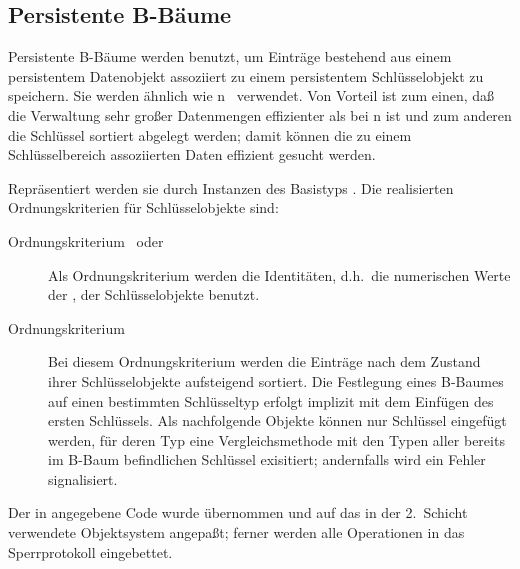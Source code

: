 \subsection{Persistente B-B\"{a}ume}%
\label{sec:plbtr}%
%
Persistente B-B\"{a}ume \cite[]{bib:gr93} werden
benutzt, um Eintr\"{a}ge bestehend aus einem persistentem Datenobjekt
assoziiert zu einem persistentem Schl\"{u}sselobjekt zu speichern. Sie
werden \"{a}hn\-lich wie \hashtbl{}n \ verwendet. Von
Vorteil ist zum einen, da\ss{} die Verwaltung sehr gro\ss{}er Datenmengen
effizienter als bei \hashtbl{}n ist und zum anderen die Schl\"{u}ssel
sortiert abgelegt werden; damit k\"{o}n\-nen die zu einem Schl\"{u}sselbereich
assoziierten Daten effizient gesucht werden.
%
\par{}Repr\"{a}sentiert werden sie durch Instanzen des Basistyps
. Die realisierten
Ordnungskriterien f\"{u}r Schl\"{u}sselobjekte sind:
\begin{description}
%
\item[Ordnungskriterium \ oder ]
Als Ordnungskriterium werden die Identit\"{a}ten, d.h.\ die numerischen
Werte der \lobjid[s], der Schl\"{u}sselobjekte benutzt.
%
\item[Ordnungskriterium ]
Bei diesem Ordnungskriterium werden die Eintr\"{a}ge nach dem Zustand
ihrer Schl\"{u}sselobjekte aufsteigend sortiert. Die Festlegung eines
B-Baumes auf einen bestimmten Schl\"{u}sseltyp erfolgt implizit mit dem
Einf\"{u}gen des ersten Schl\"{u}ssels. Als nachfolgende Objekte k\"{o}n\-nen nur
Schl\"{u}ssel eingef\"{u}gt werden, f\"{u}r deren Typ eine Vergleichsmethode
mit den Typen aller bereits im B-Baum befindlichen Schl\"{u}ssel
exisitiert; andernfalls wird ein Fehler signalisiert.
%
\end{description}
%
\par{}Der in \cite[]{bib:wi83} angegebene
Code wurde \"{u}bernommen und auf das in der 2.\ Schicht verwendete
Objektsystem angepa\ss{}t; ferner werden alle Operationen in
das Sperrprotokoll eingebettet.
%
